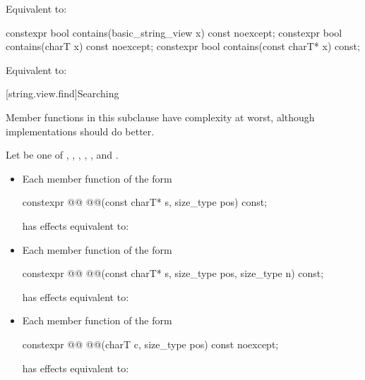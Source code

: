 \begin{itemdescr}
\pnum
\effects
Equivalent to: 
\end{itemdescr}

%
\begin{itemdecl}
constexpr bool contains(basic_string_view x) const noexcept;
constexpr bool contains(charT x) const noexcept;
constexpr bool contains(const charT* x) const;
\end{itemdecl}

\begin{itemdescr}
\pnum
\effects
Equivalent to: 
\end{itemdescr}

[string.view.find]{Searching}

\pnum
Member functions in this subclause have complexity  at worst,
although implementations should do better.

\pnum
Let  be one of
,
,
,
,
,
and
.
\begin{itemize}
\item
Each member function of the form
\begin{codeblock}
constexpr @@ @@(const charT* s, size_type pos) const;
\end{codeblock}
has effects equivalent to: 

\item
Each member function of the form
\begin{codeblock}
constexpr @@ @@(const charT* s, size_type pos, size_type n) const;
\end{codeblock}
has effects equivalent to: 

\item
Each member function of the form
\begin{codeblock}
constexpr @@ @@(charT c, size_type pos) const noexcept;
\end{codeblock}
has effects equivalent to: 
\end{itemize}

